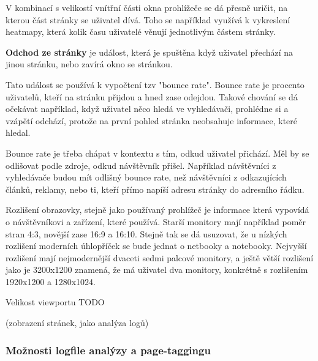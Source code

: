 \documentclass[bc,female,java,dept456]{diploma}						%
\begin{document}
V kombinací s velikostí vnítřní části okna prohlížeče se dá přesně uričit, na kterou část stránky se uživatel dívá. Toho se například využívá k vykreslení heatmapy, která kolik času uživatelé věnují jednotlivým částem stránky. 



{\bf Odchod ze stránky} je událost, která je spuštěna když uživatel přechází na jinou stránku, nebo zavírá okno se stránkou. 

Tato událost se používá k vypočtení tzv "bounce rate". Bounce rate je procento uživatelů, kteří na stránku přijdou a hned zase odejdou. Takové chování se dá očekávat například, když uživatel něco hledá ve vyhledávači, prohlédne si a vzápětí odchází, protože na první pohled stránka neobsahuje informace, které hledal.

Bounce rate je třeba chápat v kontextu s tím, odkud uživatel přichází. Měl by se odlišovat podle zdroje, odkud návštěvník přišel. Například návštěvníci z vyhledávače budou mít odlišný bounce rate, než návštěvníci z odkazujících článků, reklamy, nebo ti, kteří přímo napíší adresu stránky do adresního řádku.


Rozlišení obrazovky, stejně jako používaný prohlížeč je informace která vypovídá o návštěvníkovi a zařízení, které používá. Starší monitory mají například poměr stran 4:3, novější zase 16:9 a 16:10. Stejně tak se dá usuzovat, že u nízkých rozlišení moderních úhlopříček se bude jednat o netbooky a notebooky. Nejvyšší rozlišení mají nejmodernější dvaceti sedmi palcové monitory, a ještě větší rozlišení jako je 3200x1200 znamená, že má uživatel dva monitory, konkrétně s rozlišením 1920x1200 a 1280x1024.


Velikost viewportu TODO


(zobrazení stránek, jako analýza logů)
 


  
  
\subsubsection{Možnosti logfile analýzy a page-taggingu}
\label{sec:moznosti}
\end{document}
